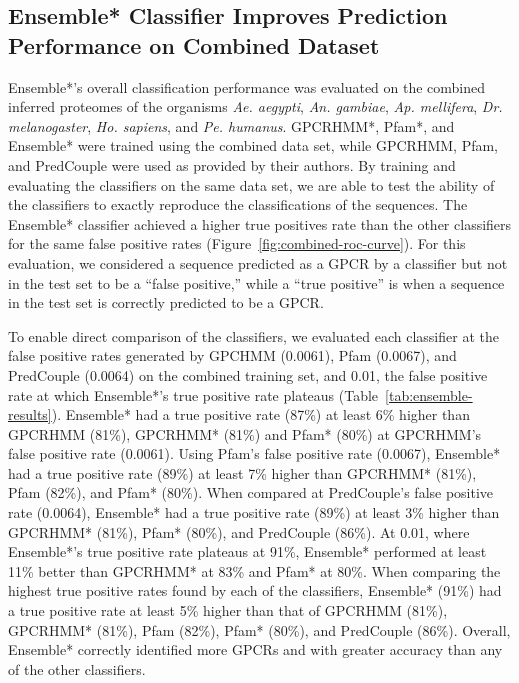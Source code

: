 \subsection{Ensemble* Classifier Improves Prediction Performance on Combined Dataset}

Ensemble*'s overall classification performance was evaluated on the combined inferred proteomes of the organisms \emph{Ae. aegypti}, \emph{An. gambiae}, \emph{Ap. mellifera}, \emph{Dr. melanogaster}, \emph{Ho. sapiens}, and \emph{Pe. humanus}.  GPCRHMM*, Pfam*, and Ensemble* were trained using the combined data set, while GPCRHMM, Pfam, and PredCouple were used as provided by their authors.  By training and evaluating the classifiers on the same data set, we are able to test the ability of the classifiers to exactly reproduce the classifications of the sequences. The Ensemble* classifier achieved a higher true positives rate than the other classifiers for the same false positive rates (Figure~\ref{fig:combined-roc-curve}).  For this evaluation, we considered a sequence predicted as a GPCR by a classifier but not in the test set to be a ``false positive,'' while a ``true positive'' is when a sequence in the test set is correctly predicted to be a GPCR.

To enable direct comparison of the classifiers, we evaluated each classifier at the false positive rates generated by GPCHMM (0.0061), Pfam (0.0067), and PredCouple (0.0064) on the combined training set, and 0.01, the false positive rate at which Ensemble*'s true positive rate plateaus (Table~\ref{tab:ensemble-results}).  Ensemble* had a true positive rate (87\%) at least 6\% higher than GPCRHMM (81\%), GPCRHMM* (81\%) and Pfam* (80\%) at GPCRHMM's false positive rate (0.0061).  Using Pfam's false positive rate (0.0067), Ensemble* had a true positive rate (89\%) at least 7\% higher than GPCRHMM* (81\%), Pfam (82\%), and Pfam* (80\%). When compared at PredCouple's false positive rate (0.0064), Ensemble* had a true positive rate (89\%) at least 3\% higher than GPCRHMM* (81\%), Pfam* (80\%), and PredCouple (86\%).  At 0.01, where Ensemble*'s true positive rate plateaus at 91\%, Ensemble* performed at least 11\% better than GPCRHMM* at 83\% and Pfam* at 80\%.  When comparing the highest true positive rates found by each of the classifiers, Ensemble* (91\%) had a true positive rate at least 5\% higher than that of GPCRHMM (81\%), GPCRHMM* (81\%), Pfam (82\%), Pfam* (80\%), and PredCouple (86\%).  Overall, Ensemble* correctly identified more GPCRs and with greater accuracy than any of the other classifiers.


